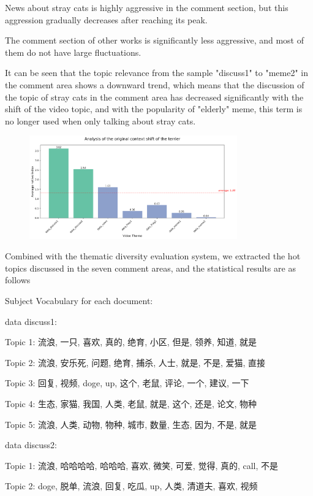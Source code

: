 \documentclass[12pt,a4paper]{ctexart}
\theoremstyle{MyLineTheoremStyle}
\theoremstyle{MyBlockTheoremStyle}
\theoremstyle{MySubsubsectionStyle}
\begin{document}
News about stray cats is highly aggressive in the comment section, but this aggression gradually decreases after reaching its peak.

The comment section of other works is significantly less aggressive, and most of them do not have large fluctuations.

It can be seen that the topic relevance from the sample "discuss1" to "meme2" in the comment area shows a downward trend, which means that the discussion of the topic of stray cats in the comment area has decreased significantly with the shift of the video topic, and with the popularity of "elderly" meme, this term is no longer used when only talking about stray cats.

\begin{figure}[htbp]
    \centering
    \includegraphics[width=0.8\textwidth]{img/context_shift.png}
\end{figure}
\newpage

Combined with the thematic diversity evaluation system, we extracted the hot topics discussed in the seven comment areas, and the statistical results are as follows

Subject Vocabulary for each document:

data discuss1:

Topic 1: 流浪, 一只, 喜欢, 真的, 绝育, 小区, 但是, 领养, 知道, 就是

Topic 2: 流浪, 安乐死, 问题, 绝育, 捕杀, 人士, 就是, 不是, 爱猫, 直接

Topic 3: 回复, 视频, doge, up, 这个, 老鼠, 评论, 一个, 建议, 一下

Topic 4: 生态, 家猫, 我国, 人类, 老鼠, 就是, 这个, 还是, 论文, 物种

Topic 5: 流浪, 人类, 动物, 物种, 城市, 数量, 生态, 因为, 不是, 就是

data discuss2:

Topic 1: 流浪, 哈哈哈哈, 哈哈哈, 喜欢, 微笑, 可爱, 觉得, 真的, call, 不是

Topic 2: doge, 脱单, 流浪, 回复, 吃瓜, up, 人类, 清道夫, 喜欢, 视频
\end{document}
